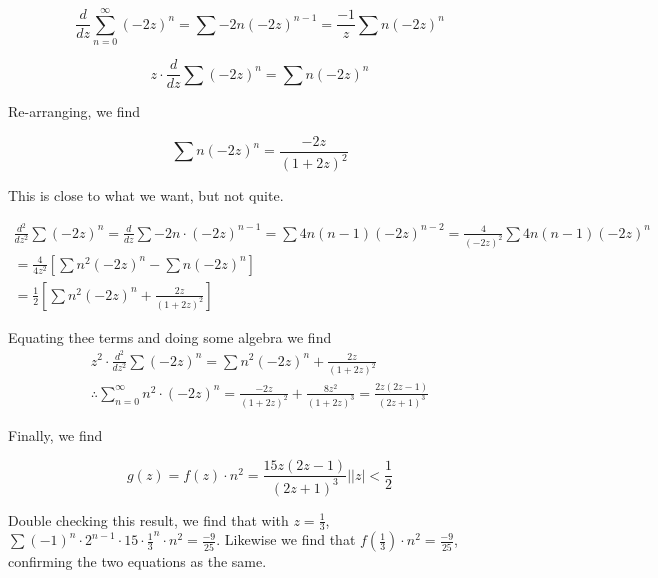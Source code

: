 \documentclass{article}
\begin{document}
\[
\frac{d}{dz} \sum_{n=0}^{\infty} (-2z)^n = \sum -2n(-2z)^{n-1} = \frac{-1}{z} \sum n(-2z)^n
\]

\[
z \cdot \frac{d}{dz} \sum (-2z)^n = \sum n(-2z)^n
\]

Re-arranging, we find

\[
\sum n(-2z)^n = \frac{-2z}{(1+2z)^2}
\]

This is close to what we want, but not quite.

\begin{align*}
\frac{d^2}{dz^2} \sum (-2z)^n = \frac{d}{dz} \sum -2n \cdot (-2z)^{n-1} = \sum 4n(n-1)(-2z)^{n-2} = \frac{4}{(-2z)^2} \sum 4n(n-1)(-2z)^n\\
= \frac{4}{4z^2} \left[ \sum n^2(-2z)^n - \sum n(-2z)^n\right]\\
= \frac{1}{2} \left[ \sum n^2(-2z)^n + \frac{2z}{(1+2z)^2}\right]
\end{align*}

Equating thee terms and doing some algebra we find
\begin{align*}
z^2 \cdot \frac{d^2}{dz^2} \sum (-2z)^n = \sum n^2(-2z)^n + \frac{2z}{(1+2z)^2}\\
\therefore \sum_{n=0}^{\infty} n^2 \cdot (-2z)^n = \frac{-2z}{(1+2z)^2} + \frac{8z^2}{(1+2z)^3} = \frac{2z(2z-1)}{(2z+1)^3}
\end{align*}

Finally, we find

\[
g(z) = f(z) \cdot n^2 = \frac{15z(2z-1)}{(2z+1)^3} \Bigr| \left|z\right| < \frac{1}{2}
\]

Double checking this result, we find that with $z = \frac{1}{3}$, $\sum (-1)^n \cdot 2^{n-1} \cdot 15 \cdot \frac{1}{3}^n \cdot n^2 = \frac{-9}{25}$.
Likewise we find that $f(\frac{1}{3}) \cdot n^2 = \frac{-9}{25}$, confirming the two equations as the same.
\end{document}

